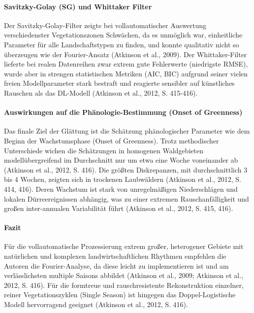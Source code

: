 \documentclass[11pt]{report}
\begin{document}
\paragraph{Savitzky-Golay (SG) und Whittaker Filter}
Der Savitzky-Golay-Filter zeigte bei vollautomatischer Auswertung verschiedenster Vegetationszonen Schwächen, da es unmöglich war, einheitliche Parameter für alle Landschaftstypen zu finden, und konnte qualitativ nicht so überzeugen wie der Fourier-Ansatz (Atkinson et al., 2009). Der Whittaker-Filter lieferte bei realen Datenreihen zwar extrem gute Fehlerwerte (niedrigste RMSE), wurde aber in strengen statistischen Metriken (AIC, BIC) aufgrund seiner vielen freien Modellparameter stark bestraft und reagierte sensibler auf künstliches Rauschen als das DL-Modell (Atkinson et al., 2012, S. 415-416).

\paragraph{Auswirkungen auf die Phänologie-Bestimmung (Onset of Greenness)}
Das finale Ziel der Glättung ist die Schätzung phänologischer Parameter wie dem Beginn der Wachstumsphase (Onset of Greenness). Trotz methodischer Unterschiede wichen die Schätzungen in homogenen Waldgebieten modellübergreifend im Durchschnitt nur um etwa eine Woche voneinander ab (Atkinson et al., 2012, S. 416). Die größten Diskrepanzen, mit durchschnittlich 3 bis 4 Wochen, zeigten sich in trockenen Laubwäldern (Atkinson et al., 2012, S. 414, 416). Deren Wachstum ist stark von unregelmäßigen Niederschlägen und lokalen Dürreereignissen abhängig, was zu einer extremen Rauschanfälligkeit und großen inter-annualen Variabilität führt (Atkinson et al., 2012, S. 415, 416).

\paragraph{Fazit}
Für die vollautomatische Prozessierung extrem großer, heterogener Gebiete mit natürlichen und komplexen landwirtschaftlichen Rhythmen empfehlen die Autoren die Fourier-Analyse, da diese leicht zu implementieren ist und am verlässlichsten multiple Saisons abbildet (Atkinson et al., 2009; Atkinson et al., 2012, S. 416). Für die formtreue und rauschresistente Rekonstruktion einzelner, reiner Vegetationszyklen (Single Season) ist hingegen das Doppel-Logistische Modell hervorragend geeignet (Atkinson et al., 2012, S. 416).

\end{document}
